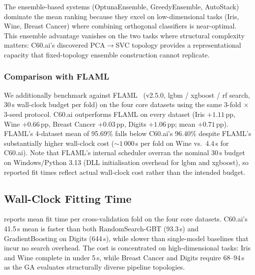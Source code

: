 \documentclass{article}
\theoremstyle{definition}
\theoremstyle{plain}
\theoremstyle{remark}
\begin{document}
The ensemble-based systems (OptunaEnsemble, GreedyEnsemble, AutoStack)
dominate the mean ranking because they excel on low-dimensional tasks
(Iris, Wine, Breast Cancer) where combining orthogonal classifiers is
near-optimal.
This ensemble advantage vanishes on the two tasks where structural complexity
matters: C60.ai's discovered PCA$\to$SVC topology provides a
representational capacity that fixed-topology ensemble construction cannot
replicate.

\subsubsection*{Comparison with FLAML}
We additionally benchmark against FLAML~\citep{wang2021flaml}
(v2.5.0, lgbm / xgboost / rf search, 30\,s wall-clock budget per fold) on
the four core datasets using the same 3-fold $\times$ 3-seed protocol.
C60.ai outperforms FLAML on every dataset
(Iris $+1.11$\,pp, Wine $+0.66$\,pp, Breast Cancer $+0.03$\,pp,
Digits $+1.06$\,pp; mean $+0.71$\,pp).
FLAML's 4-dataset mean of 95.69\% falls below C60.ai's 96.40\%
despite FLAML's substantially higher wall-clock cost
(${\sim}1\,000$\,s per fold on Wine vs.\ 4.4\,s for C60.ai).
Note that FLAML's internal scheduler overran the nominal 30\,s budget
on Windows/Python 3.13 (DLL initialisation overhead for lgbm and xgboost),
so reported fit times reflect actual wall-clock cost rather than the
intended budget.

\subsection{Wall-Clock Fitting Time}
\label{sec:timing}

 reports mean fit time per cross-validation fold on the
four core datasets.
C60.ai's 41.5\,s mean is faster than both RandomSearch-GBT (93.3\,s) and
GradientBoosting on Digits (644\,s), while slower than single-model baselines
that incur no search overhead.
The cost is concentrated on high-dimensional tasks: Iris and Wine complete in
under 5\,s, while Breast Cancer and Digits require 68--94\,s as the GA
evaluates structurally diverse pipeline topologies.
\end{document}
